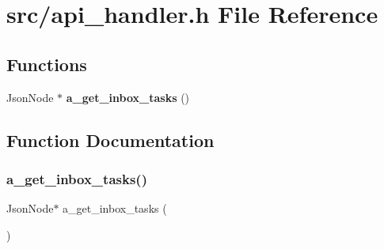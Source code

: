 \section{src/api\+\_\+handler.h File Reference}
\label{api__handler_8h}
\subsection*{Functions}
\begin{DoxyCompactItemize}
\item 
Json\+Node $\ast$ \textbf{ a\+\_\+get\+\_\+inbox\+\_\+tasks} ()
\end{DoxyCompactItemize}


\subsection{Function Documentation}
\mbox{\label{api__handler_8h_aad3b42b9a6dfd0a86a95eca2363dab11}} 
\subsubsection{a\+\_\+get\+\_\+inbox\+\_\+tasks()}
{\footnotesize\ttfamily Json\+Node$\ast$ a\+\_\+get\+\_\+inbox\+\_\+tasks (\begin{DoxyParamCaption}{ }\end{DoxyParamCaption})}

